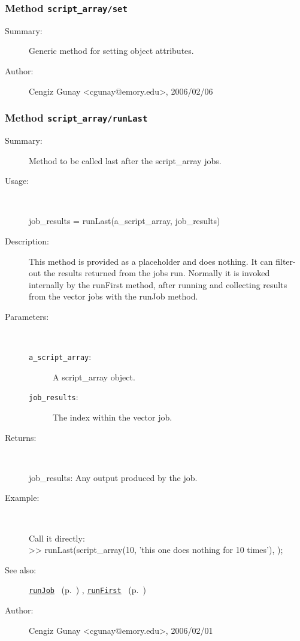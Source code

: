 \subsubsection[Method \texttt{set}]{Method \texttt{script\_array/set}}%
%
\label{ref_script_array__set}%
\hypertarget{ref_script_array__set}{}%
\begin{description}
\item[Summary:]Generic method for setting object attributes.
%
%
%
%
%
%
%
\item[Author:]%
Cengiz Gunay <cgunay@emory.edu>, 2006/02/06%
\end{description}
\methodline%
\subsubsection[Method \texttt{runLast}]{Method \texttt{script\_array/runLast}}%
%
\label{ref_script_array__runLast}%
\hypertarget{ref_script_array__runLast}{}%
\begin{description}
\item[Summary:]Method to be called last after the script\_array jobs.
%
\item[Usage:]~%
\begin{lyxcode}%
job\_results = runLast(a\_script\_array, job\_results)
%
\end{lyxcode}%
%
\item[Description:]%
This method is provided as a placeholder and does nothing. It can filter-out the
 results returned from the jobs run. Normally it is invoked internally by the runFirst
 method, after running and collecting results from the vector jobs with the runJob method.
\item[Parameters:]~
\begin{description}%
\item[\texttt{a\_script\_array}:]
 A script\_array object.
\item[\texttt{job\_results}:]
 The index within the vector job.
\end{description}%
%
\item[Returns:]~

   job\_results: Any output produced by the job.
%
\item[Example:]~
\begin{lyxcode} Call it directly:\\%
 >> runLast(script\_array(10, 'this one does nothing for 10 times'), {});\\%
\end{lyxcode}
%
\item[See also:]%
\hyperlink{ref_runJob}{\texttt{runJob}}%
\ (p.~\pageref{ref_runJob})%
%
, \hyperlink{ref_runFirst}{\texttt{runFirst}}%
\ (p.~\pageref{ref_runFirst})%
%
%
\item[Author:]%
Cengiz Gunay <cgunay@emory.edu>, 2006/02/01%
\end{description}
\methodline%
